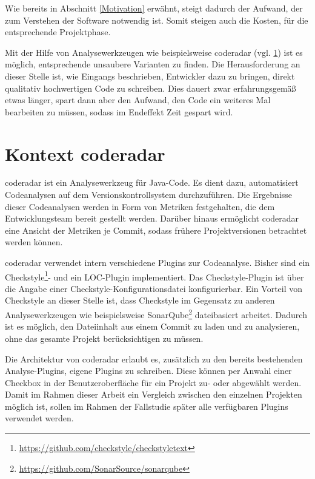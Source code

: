 \documentclass[
	oneside,  %
	ngerman, 
	final, 
	11pt, 
	a4paper, 
	1.1headlines, 
	headinclude=false, 
	footinclude=false, 
	mpinclude=false, 
	pagesize, 
	onecolumn, 
	titlepage, 
	parskip=half, 
	headsepline, 
	chapterprefix=false, 
	version=first, 
	listof=totoc, 
	bibliography=totoc, 
	toc=graduated, 
	fleqn
]{scrbook}
\begin{document}
Wie bereits in Abschnitt \ref{Motivation} erwähnt, steigt dadurch der Aufwand, der zum Verstehen der Software notwendig ist.
Somit steigen auch die Kosten, für die entsprechende Projektphase.

Mit der Hilfe von Analysewerkzeugen wie beispielsweise coderadar (vgl. \ref{Kontext}) ist es möglich, entsprechende unsaubere Varianten zu finden.
Die Herausforderung an dieser Stelle ist, wie Eingangs beschrieben, Entwickler dazu zu bringen, direkt qualitativ hochwertigen Code zu schreiben.
Dies dauert zwar erfahrungsgemäß etwas länger, spart dann aber den Aufwand, den Code ein weiteres Mal bearbeiten zu müssen, sodass im Endeffekt Zeit gespart wird.

\section{Kontext coderadar}
\label{Kontext}
coderadar ist ein Analysewerkzeug für Java-Code.
Es dient dazu, automatisiert Codeanalysen auf dem Versionskontrollsystem durchzuführen.
Die Ergebnisse dieser Codeanalysen werden in Form von Metriken festgehalten, die dem Entwicklungsteam bereit gestellt werden.
Darüber hinaus ermöglicht coderadar eine Ansicht der Metriken je Commit, sodass frühere Projektversionen betrachtet werden können.

coderadar verwendet intern verschiedene Plugins zur Codeanalyse.
Bisher sind ein Checkstyle\footnote{\url{https://github.com/checkstyle/checkstyletext}}- und ein \acf{LOC}-Plugin implementiert.
Das Checkstyle-Plugin ist über die Angabe einer Checkstyle-Konfigurationsdatei konfigurierbar.
Ein Vorteil von Checkstyle an dieser Stelle ist, dass Checkstyle im Gegensatz zu anderen Analysewerkzeugen wie beispielsweise SonarQube\footnote{\url{https://github.com/SonarSource/sonarqube}} dateibasiert arbeitet.
Dadurch ist es möglich, den Dateiinhalt aus einem Commit zu laden und zu analysieren, ohne das gesamte Projekt berücksichtigen zu müssen.

Die Architektur von coderadar erlaubt es, zusätzlich zu den bereits bestehenden Analyse-Plugins, eigene Plugins zu schreiben.
Diese können per Anwahl einer Checkbox in der Benutzeroberfläche für ein Projekt zu- oder abgewählt werden.
Damit im Rahmen dieser Arbeit ein Vergleich zwischen den einzelnen Projekten möglich ist, sollen im Rahmen der Fallstudie später alle verfügbaren Plugins verwendet werden.
\end{document}
